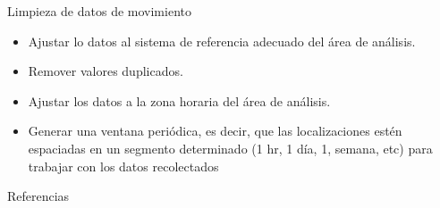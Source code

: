 \documentclass[11pt]{beamer}
\begin{document}
\begin{frame}{Limpieza de datos de movimiento}
	\begin{itemize}
		\item Ajustar lo datos al sistema de referencia adecuado del área de análisis.

		\item  Remover valores duplicados.

		\item  Ajustar los datos a la zona horaria del área de análisis.

		\item  Generar una ventana periódica, es decir, que las localizaciones estén espaciadas en un segmento determinado (1 hr, 1 día, 1, semana, etc) para trabajar con los datos recolectados

	\end{itemize}
\end{frame}


\begin{frame}{Referencias}
 

\end{frame}
\end{document}
